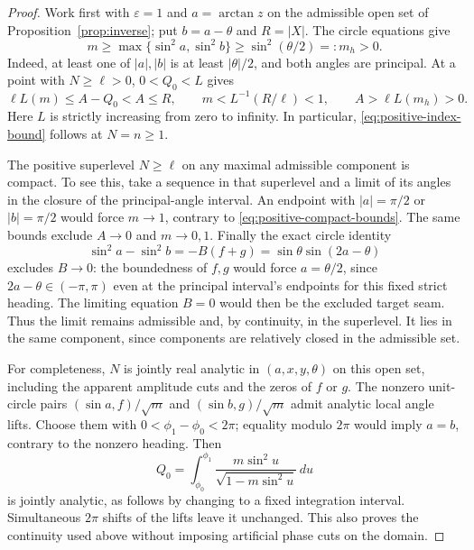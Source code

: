 \documentclass[11pt,a4paper]{article}
\theoremstyle{remark}\newtheorem{remark}[theorem]{Remark}
\begin{document}
\begin{proof}
Work first with $\varepsilon=1$ and $a=\arctan z$ on the admissible open
set of Proposition~\ref{prop:inverse}; put $b=a-\theta$ and $R=|X|$.
The circle equations give
\begin{equation}\label{eq:positive-modulus-bound}
 m\ge\max\{\sin^2a,\sin^2b\}\ge\sin^2(\theta/2)=:m_h>0.
\end{equation}
Indeed, at least one of $|a|,|b|$ is at least $|\theta|/2$, and both
angles are principal. At a point with $N\ge\ell>0$, $0<Q_0<L$ gives
\begin{equation}\label{eq:positive-compact-bounds}
 \ell L(m)\le A-Q_0<A\le R,\qquad
 m<L^{-1}(R/\ell)<1,\qquad A>\ell L(m_h)>0.
\end{equation}
Here $L$ is strictly increasing from zero to infinity. In particular,
\eqref{eq:positive-index-bound} follows at $N=n\ge1$.

The positive superlevel $N\ge\ell$ on any maximal admissible component
is compact. To see this, take a sequence in that superlevel and a limit
of its angles in the closure of the principal-angle interval.
An endpoint with $|a|=\pi/2$ or $|b|=\pi/2$ would force $m\to1$,
contrary to \eqref{eq:positive-compact-bounds}. The same bounds exclude
$A\to0$ and $m\to0,1$. Finally the exact circle identity
\[
 \sin^2a-\sin^2b=-B(f+g)
      =\sin\theta\sin(2a-\theta)
\]
excludes $B\to0$: the boundedness of $f,g$ would force $a=\theta/2$,
since $2a-\theta\in(-\pi,\pi)$ even at the principal interval's
endpoints for this fixed strict heading. The limiting equation $B=0$
would then be the excluded target seam. Thus the limit remains
admissible and, by continuity, in the superlevel. It lies in the same
component, since components are relatively closed in the admissible set.

For completeness, $N$ is jointly real analytic in $(a,x,y,\theta)$
on this open set, including the apparent amplitude cuts and the zeros
of $f$ or $g$. The nonzero unit-circle pairs
$(\sin a,f)/\sqrt m$ and $(\sin b,g)/\sqrt m$ admit analytic local
angle lifts. Choose them with $0<\phi_1-\phi_0<2\pi$; equality modulo
$2\pi$ would imply $a=b$, contrary to the nonzero heading. Then
\[
 Q_0=\int_{\phi_0}^{\phi_1}
          \frac{m\sin^2u}{\sqrt{1-m\sin^2u}}\,du
\]
is jointly analytic, as follows by changing to a fixed integration
interval. Simultaneous $2\pi$ shifts of the lifts leave it unchanged.
This also proves the continuity used above without imposing artificial
phase cuts on the domain.


\end{proof}
\end{document}
